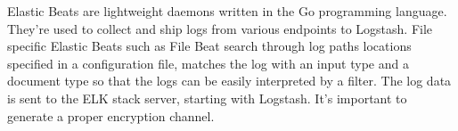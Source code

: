 \documentclass[./main.tex]{subfiles}
\begin{document}
Elastic Beats are lightweight daemons written in the Go programming language. They’re used to collect and ship logs from various endpoints to Logstash. File specific Elastic Beats such as File Beat search through log paths locations specified in a configuration file, matches the log with an input type and a document type so that the logs can be easily interpreted by a filter. The log data is sent to the ELK stack server, starting with Logstash. It’s important to generate a proper encryption channel.
\end{document}
